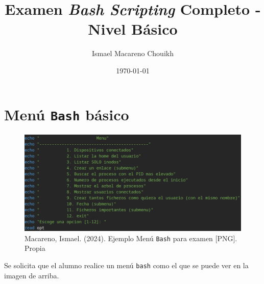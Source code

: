 \documentclass[11pt]{article}
\author{Ismael Macareno Chouikh}
\date{\today}
\title{Examen \emph{Bash Scripting} Completo - Nivel Básico}
\begin{document}
\maketitle

\section{Menú \texttt{Bash} básico}
\label{sec:org605a561}
\begin{figure}[htbp]
\centering
\includegraphics[width=.9\linewidth]{../examenes/img/ejemplo-script-menu-basico.png}
\caption{Macareno, Ismael. (2024). Ejemplo Menú \texttt{Bash} para examen [PNG]. Propia}
\end{figure}

Se solicita que el alumno realice un menú \texttt{bash} como el que se puede ver en la imagen de arriba.
\end{document}
